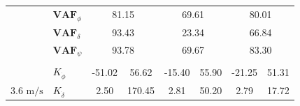 \begin{table}[]
\begin{tabular}{llcccccc}
                                                   & $\mathbf{VAF}_\phi$                                    & \multicolumn{2}{c}{81.15}                                                                          & \multicolumn{2}{c}{69.61}                                                                          & \multicolumn{2}{c}{80.01}                                                                          \\
                                                   & $\mathbf{VAF}_\delta$                                  & \multicolumn{2}{c}{93.43}                                                                          & \multicolumn{2}{c}{23.34}                                                                          & \multicolumn{2}{c}{66.84}                                                                          \\
                                                   & $\mathbf{VAF}_\psi$                                    & \multicolumn{2}{c}{93.78}                                                                          & \multicolumn{2}{c}{69.67}                                                                          & \multicolumn{2}{c}{83.30}                                                                          \\
                                                   &                                                        & \multicolumn{1}{l}{}                        & \multicolumn{1}{l}{}                                 & \multicolumn{1}{l}{}                        & \multicolumn{1}{l}{}                                 & \multicolumn{1}{l}{}                        & \multicolumn{1}{l}{}                                 \\ \hline
                                                   & $K_{\dot{\phi}} $                                      & -51.02                                      & 56.62                                                & -15.40                                      & 55.90                                                & -21.25                                      & 51.31                                                \\
    \multirow{-2}{*}{3.6 $\si{\meter\per\second}$} & $K_{\dot{\delta}}$                                     & 2.50                                        & 170.45                                               & 2.81                                        & 50.20                                                & 2.79                                        & 17.72                                                \\

\end{tabular}
\end{table}
